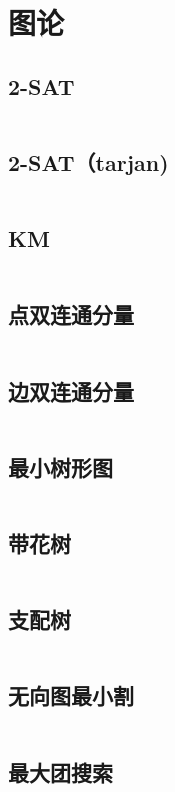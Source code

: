 \section{图论}
\subsection{2-SAT}
\inputminted{cpp}{\source/graph-theory/sat-lexicographically.cpp}
\subsection{2-SAT（tarjan)}
\inputminted{cpp}{\source/graph-theory/2-sat-tarjan.cpp}
\subsection{KM}
\inputminted{cpp}{\source/graph-theory/KM.cpp}
\subsection{点双连通分量}
\inputminted{cpp}{\source/graph-theory/biconnected-graph-vertex.cpp}
\subsection{边双连通分量}
\inputminted{cpp}{\source/graph-theory/biconnected-graph-edge.cpp}
\subsection{最小树形图}
\inputminted{cpp}{\source/graph-theory/optimum-branching.cpp}
\subsection{带花树}
\inputminted{cpp}{\source/graph-theory/blossom-algorithm.cpp}
\subsection{支配树}
\inputminted{cpp}{\source/graph-theory/dominator-tree.cpp}
\subsection{无向图最小割}
\inputminted{cpp}{\source/graph-theory/stoer-wagner-algorithm.cpp}
\subsection{最大团搜索}
\inputminted{cpp}{\source/graph-theory/maxclique.cpp}
